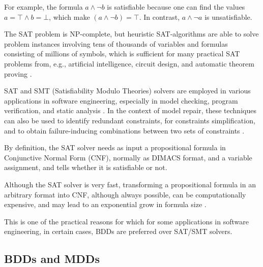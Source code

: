 For example, the formula $a \wedge \neg b$ is satisfiable because one can find the values $a = \top \wedge b = \bot$, which make $(a \wedge \neg b) = \top$. In contrast, $a \wedge \neg a$ is unsatisfiable.

The  SAT problem is NP-complete, but heuristic SAT-algorithms are able to solve problem instances involving tens of thousands of variables and formulas consisting of millions of symbols, which is sufficient for many practical SAT problems from, e.g., artificial intelligence, circuit design, and automatic theorem proving \cite{lagniez_factoring_2013,biere2009handbook}.

SAT and SMT (Satisfiability Modulo Theories) solvers are employed in various applications in software engineering, especially in model checking, program verification, and static analysis \cite{CalvagnaG09,sat2008}.
In the context of model repair, these techniques can also be used to identify redundant constraints, for constraints simplification, and to obtain failure-inducing combinations between two sets of constraints \cite{Zhang2012FII}.

By definition, the SAT solver needs as input a propositional formula in Conjunctive Normal Form (CNF), normally as DIMACS format, and a variable assignment, and tells whether it is satisfiable or not.

Although the SAT solver is very fast, transforming a propositional formula in an arbitrary format into CNF, although always possible, can be computationally expensive, and may lead to an exponential grow in formula size \cite{sheridan2004optimality}.

This is one of the practical reasons for which for some applications in software engineering, in certain cases, BDDs are preferred over SAT/SMT solvers.


\subsection{BDDs and MDDs}

